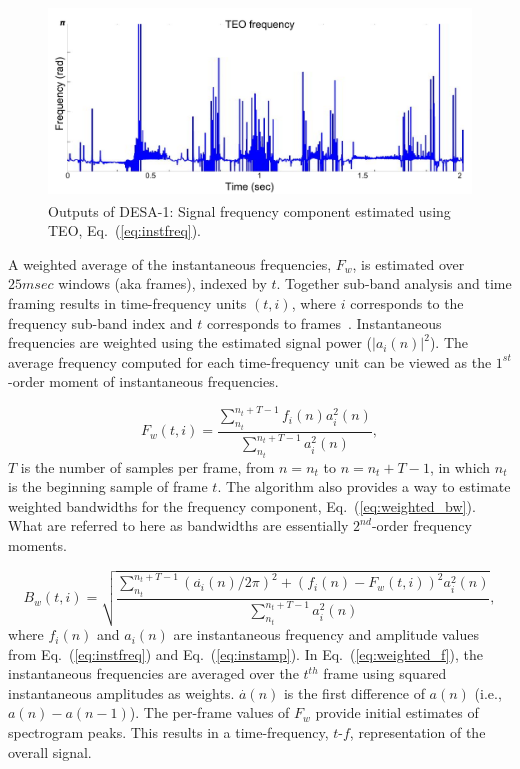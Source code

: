 {\begin{figure}[h!]
	\centering
	\includegraphics[height=2in, width=1\textwidth]{figures/teo_freq}
	\caption{ Outputs of DESA-1: Signal frequency component estimated using TEO,  Eq.~(\ref{eq:instfreq}).}
	\label{fig:ch2_inputfrequency}
\end{figure}

A weighted average of the instantaneous frequencies, $F_w$, is estimated over $25msec$ windows (aka frames), indexed by $t$. 
Together sub-band analysis and time framing results in time-frequency units $(t,i)$, where $i$ corresponds to the frequency sub-band index and $t$ corresponds to frames~\cite{cohenlee90}.
Instantaneous frequencies are weighted using the estimated signal power ($|a_i(n)|^2$). 
The average frequency computed for each time-frequency unit can be viewed as the $1^{st}$-order moment of instantaneous frequencies.  


\begin{equation}
\label{eq:weighted_f}
F_w(t,i) = \frac{\sum_{n_t}^{n_t+T - 1}f_i(n)a_i^2(n)}{\sum_{n_t}^{n_t+T - 1}a_i^2(n)},
\end{equation}
$T$ is the number of samples per frame, from $n = n_t$ to $n = n_t+T - 1$, in which $n_t$ is the beginning sample of frame $t$. 
The algorithm also provides a way to estimate weighted bandwidths for the frequency component, Eq.~(\ref{eq:weighted_bw}). 
What are referred to here as bandwidths are essentially $2^{nd}$-order frequency moments. 

\begin{equation}
\label{eq:weighted_bw}
B_w(t,i) = \sqrt{\frac{\sum_{n_t}^{n_t+T-1}(\overset{\boldsymbol .}{a_i}(n) /2\pi)^2+(f_i(n)-F_w(t,i))^2a_i^2(n)}{\sum_{n_t}^{n_t+T-1}a_i^2(n)}},
\end{equation}
where $f_i(n)$ and $a_i(n)$ are instantaneous frequency and amplitude values from Eq.~(\ref{eq:instfreq}) and Eq.~(\ref{eq:instamp}). 
In Eq.~(\ref{eq:weighted_f}), the instantaneous frequencies are averaged over the $t^{th}$ frame using squared instantaneous amplitudes as weights. 
$\overset{\boldsymbol .}{a}(n)$ is the first difference of $a(n)$ (i.e., $a(n) - a(n-1)$). 
The per-frame values of $F_w$ provide initial estimates of spectrogram peaks. 
This results in a time-frequency, {$t$-$f$}, representation of the overall signal. 


}
